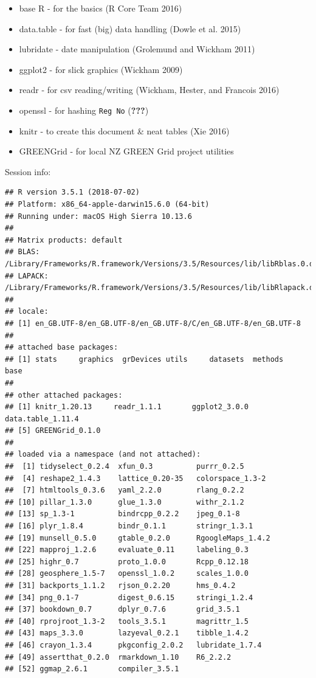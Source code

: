 \documentclass[]{article}
\providecommand{\tightlist}{%
  \setlength{\itemsep}{0pt}\setlength{\parskip}{0pt}}
\begin{document}
\begin{itemize}
\tightlist
\item
  base R - for the basics (R Core Team 2016)
\item
  data.table - for fast (big) data handling (Dowle et al. 2015)
\item
  lubridate - date manipulation (Grolemund and Wickham 2011)
\item
  ggplot2 - for slick graphics (Wickham 2009)
\item
  readr - for csv reading/writing (Wickham, Hester, and Francois 2016)
\item
  openssl - for hashing \texttt{Reg\ No} ({\textbf{???}})
\item
  knitr - to create this document \& neat tables (Xie 2016)
\item
  GREENGrid - for local NZ GREEN Grid project utilities
\end{itemize}

Session info:

\begin{verbatim}
## R version 3.5.1 (2018-07-02)
## Platform: x86_64-apple-darwin15.6.0 (64-bit)
## Running under: macOS High Sierra 10.13.6
## 
## Matrix products: default
## BLAS: /Library/Frameworks/R.framework/Versions/3.5/Resources/lib/libRblas.0.dylib
## LAPACK: /Library/Frameworks/R.framework/Versions/3.5/Resources/lib/libRlapack.dylib
## 
## locale:
## [1] en_GB.UTF-8/en_GB.UTF-8/en_GB.UTF-8/C/en_GB.UTF-8/en_GB.UTF-8
## 
## attached base packages:
## [1] stats     graphics  grDevices utils     datasets  methods   base     
## 
## other attached packages:
## [1] knitr_1.20.13     readr_1.1.1       ggplot2_3.0.0     data.table_1.11.4
## [5] GREENGrid_0.1.0  
## 
## loaded via a namespace (and not attached):
##  [1] tidyselect_0.2.4  xfun_0.3          purrr_0.2.5      
##  [4] reshape2_1.4.3    lattice_0.20-35   colorspace_1.3-2 
##  [7] htmltools_0.3.6   yaml_2.2.0        rlang_0.2.2      
## [10] pillar_1.3.0      glue_1.3.0        withr_2.1.2      
## [13] sp_1.3-1          bindrcpp_0.2.2    jpeg_0.1-8       
## [16] plyr_1.8.4        bindr_0.1.1       stringr_1.3.1    
## [19] munsell_0.5.0     gtable_0.2.0      RgoogleMaps_1.4.2
## [22] mapproj_1.2.6     evaluate_0.11     labeling_0.3     
## [25] highr_0.7         proto_1.0.0       Rcpp_0.12.18     
## [28] geosphere_1.5-7   openssl_1.0.2     scales_1.0.0     
## [31] backports_1.1.2   rjson_0.2.20      hms_0.4.2        
## [34] png_0.1-7         digest_0.6.15     stringi_1.2.4    
## [37] bookdown_0.7      dplyr_0.7.6       grid_3.5.1       
## [40] rprojroot_1.3-2   tools_3.5.1       magrittr_1.5     
## [43] maps_3.3.0        lazyeval_0.2.1    tibble_1.4.2     
## [46] crayon_1.3.4      pkgconfig_2.0.2   lubridate_1.7.4  
## [49] assertthat_0.2.0  rmarkdown_1.10    R6_2.2.2         
## [52] ggmap_2.6.1       compiler_3.5.1
\end{verbatim}
\end{document}
